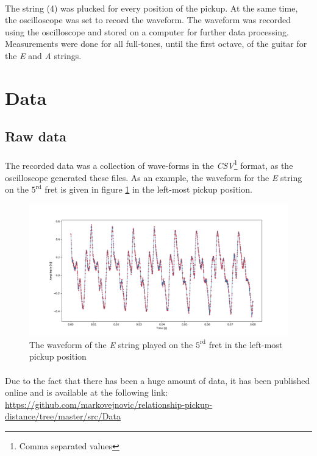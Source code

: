 \documentclass{article}
\begin{document}
\paragraph*{}
The string (4) was plucked for every position of the pickup. At the same time, 
the oscilloscope was set to record the waveform. The waveform was recorded 
using the oscilloscope and stored on a computer for further data processing. 
Measurements were done for all full-tones, until the first octave, of the 
guitar for the \textit{E} and \textit{A} strings.

\section{Data}

\subsection{Raw data}
\paragraph*{}
The recorded data was a collection of wave-forms in the \textit{CSV}\footnote{
Comma separated values} format, as the oscilloscope generated these files. As 
an example, the waveform for the \textit{E} string on the $5^{\text{rd}}$ fret 
is given in figure \ref{fig:wave-0-5-e} in the left-most pickup position.
\begin{figure}[ht]
	\centering
	\includegraphics[width=\textwidth]{img/wave-0-5-e}
	\caption{The waveform of the \textit{E} string played on the 
	$5^{\text{rd}}$ fret in the left-most pickup position}
	\label{fig:wave-0-5-e}
\end{figure}

\paragraph*{}
Due to the fact that there has been a huge amount of data, it has been 
published online and is available at the following link: 
\url{
	https://github.com/markovejnovic/relationship-pickup-distance/tree/master/src/Data
}
\end{document}
